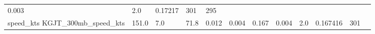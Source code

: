 \documentclass[11pt]{article}
\begin{document}
\begin{longtable}[]{@{}llllllllllll@{}}
\begin{minipage}[t]{0.04\columnwidth}
0.003\strut
\end{minipage} & \begin{minipage}[t]{0.05\columnwidth}\raggedright\strut
2.0\strut
\end{minipage} & \begin{minipage}[t]{0.05\columnwidth}\raggedright\strut
0.17217\strut
\end{minipage} & \begin{minipage}[t]{0.05\columnwidth}\raggedright\strut
301\strut
\end{minipage} & \begin{minipage}[t]{0.07\columnwidth}\raggedright\strut
295\strut
\end{minipage}\tabularnewline
\begin{minipage}[t]{0.18\columnwidth}\raggedright\strut
speed\_kts KGJT\_300mb\_speed\_kts\strut
\end{minipage} & \begin{minipage}[t]{0.04\columnwidth}\raggedright\strut
151.0\strut
\end{minipage} & \begin{minipage}[t]{0.04\columnwidth}\raggedright\strut
7.0\strut
\end{minipage} & \begin{minipage}[t]{0.04\columnwidth}\raggedright\strut
71.8\strut
\end{minipage} & \begin{minipage}[t]{0.04\columnwidth}\raggedright\strut
0.012\strut
\end{minipage} & \begin{minipage}[t]{0.05\columnwidth}\raggedright\strut
0.004\strut
\end{minipage} & \begin{minipage}[t]{0.04\columnwidth}\raggedright\strut
0.167\strut
\end{minipage} & \begin{minipage}[t]{0.04\columnwidth}\raggedright\strut
0.004\strut
\end{minipage} & \begin{minipage}[t]{0.05\columnwidth}\raggedright\strut
2.0\strut
\end{minipage} & \begin{minipage}[t]{0.05\columnwidth}\raggedright\strut
0.167416\strut
\end{minipage} & \begin{minipage}[t]{0.05\columnwidth}\raggedright\strut
301\strut
\end{minipage} & \begin{minipage}[t]{0.07\columnwidth}\raggedright\strut

\end{minipage}
\end{longtable}
\end{document}

